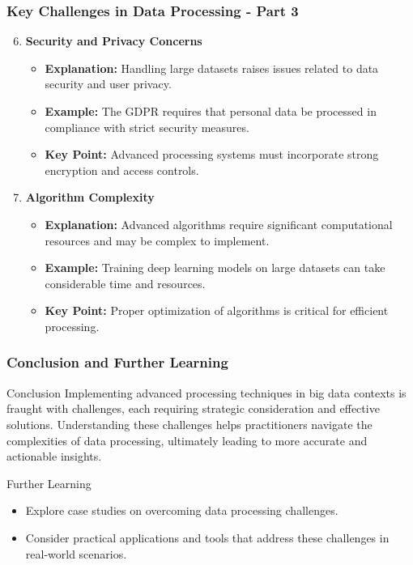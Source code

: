 \documentclass[aspectratio=169]{beamer}
\begin{document}
\begin{frame}[fragile]
    \frametitle{Key Challenges in Data Processing - Part 3}
    
    \begin{enumerate}
        \setcounter{enumi}{5} %
        \item \textbf{Security and Privacy Concerns}
            \begin{itemize}
                \item \textbf{Explanation:} Handling large datasets raises issues related to data security and user privacy.
                \item \textbf{Example:} The GDPR requires that personal data be processed in compliance with strict security measures.
                \item \textbf{Key Point:} Advanced processing systems must incorporate strong encryption and access controls.
            \end{itemize}

        \item \textbf{Algorithm Complexity}
            \begin{itemize}
                \item \textbf{Explanation:} Advanced algorithms require significant computational resources and may be complex to implement.
                \item \textbf{Example:} Training deep learning models on large datasets can take considerable time and resources.
                \item \textbf{Key Point:} Proper optimization of algorithms is critical for efficient processing.
            \end{itemize}
    \end{enumerate}
\end{frame}

\begin{frame}[fragile]
    \frametitle{Conclusion and Further Learning}

    \begin{block}{Conclusion}
        Implementing advanced processing techniques in big data contexts is fraught with challenges, each requiring strategic consideration and effective solutions. Understanding these challenges helps practitioners navigate the complexities of data processing, ultimately leading to more accurate and actionable insights.
    \end{block}

    \begin{block}{Further Learning}
        \begin{itemize}
            \item Explore case studies on overcoming data processing challenges.
            \item Consider practical applications and tools that address these challenges in real-world scenarios.
        \end{itemize}
    \end{block}
\end{frame}
\end{document}
